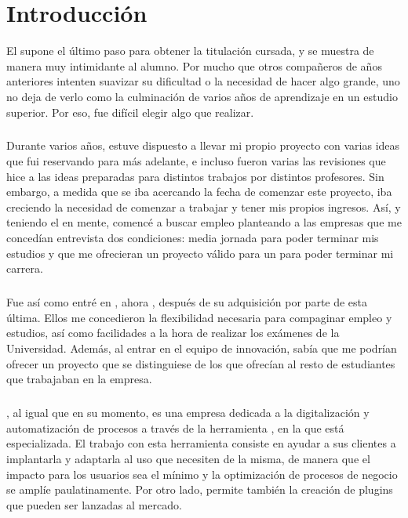 \documentclass{subfiles}
\begin{document}
    \chapter{Introducción}
    \label{chap:introduccion}


        {El \TFG supone el último paso para obtener la titulación cursada, y se muestra de manera muy intimidante al alumno. Por mucho que otros compañeros de años anteriores intenten suavizar su dificultad o la necesidad de hacer algo grande, uno no deja de verlo como la culminación de varios años de aprendizaje en un estudio superior. Por eso, fue difícil elegir algo que realizar.}
      
        \paragraph{}
        {Durante varios años, estuve dispuesto a llevar mi propio proyecto con varias ideas que fui reservando para más adelante, e incluso fueron varias las revisiones que hice a las ideas preparadas para distintos trabajos por distintos profesores. Sin embargo, a medida que se iba acercando la fecha de comenzar este proyecto, iba creciendo la necesidad de comenzar a trabajar y tener mis propios ingresos. Así, y teniendo el \TFG en mente, comencé a buscar empleo planteando a las empresas que me concedían entrevista dos condiciones: media jornada para poder terminar mis estudios y que me ofrecieran un proyecto válido para un \tfg para poder terminar mi carrera.}
      
        \paragraph{}
        {Fue así como entré en \silverstorm, ahora \thirdera, después de su adquisición por parte de esta última. Ellos me concedieron la flexibilidad necesaria para compaginar empleo y estudios, así como facilidades a la hora de realizar los exámenes de la Universidad. Además, al entrar en el equipo de innovación, sabía que me podrían ofrecer un proyecto que se distinguiese de los que ofrecían al resto de estudiantes que trabajaban en la empresa.}

        \paragraph{}
        {\thirdera, al igual que \silverstorm en su momento, es una empresa dedicada a la digitalización y automatización de procesos a través de la herramienta \servicenow, en la que está especializada. El trabajo con esta herramienta consiste en ayudar a sus clientes a implantarla y adaptarla al uso que necesiten de la misma, de manera que el impacto para los usuarios sea el mínimo y la optimización de procesos  de negocio se amplíe paulatinamente. Por otro lado, \servicenow permite también la creación de plugins que pueden ser lanzadas al mercado.}
\end{document}
